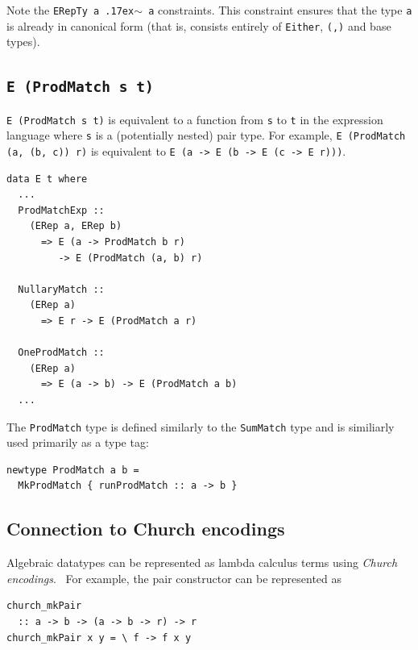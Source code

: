 \documentclass[runningheads, a4paper]{llncs}
\newcommand{\typeeq}{\raise.17ex\hbox{$\scriptstyle\mathtt{\sim}$}\,\;}
\newcommand{\ttt}{\texttt}
\newcommand{\showtodos}{}  %
\newenvironment{todo}
  {\ifthenelse{\isundefined{\showtodos}}{\comment}{\begin{tcolorbox}
    \textbf{TODO}:}}
  {\ifthenelse{\isundefined{\showtodos}}{\endcomment}{\end{tcolorbox}}
  }
\begin{document}
Note the \ttt{ERepTy a \typeeq a} constraints. This constraint ensures that the type
\ttt{a} is already in canonical form (that is, consists entirely of
\ttt{Either}, \ttt{(,)} and base types).

\subsection{\ttt{E (ProdMatch s t)}}

\ttt{E (ProdMatch s t)} is equivalent to a function from \ttt{s} to
\ttt{t} in the expression language where \ttt{s} is a (potentially
nested) pair type. For example, \ttt{E (ProdMatch (a, (b, c)) r)} is
equivalent to \ttt{E (a -> E (b -> E (c -> E r)))}.

\begin{lstlisting}
data E t where
  ...
  ProdMatchExp ::
    (ERep a, ERep b)
      => E (a -> ProdMatch b r)
         -> E (ProdMatch (a, b) r)

  NullaryMatch ::
    (ERep a)
      => E r -> E (ProdMatch a r)

  OneProdMatch ::
    (ERep a)
      => E (a -> b) -> E (ProdMatch a b)
  ...
\end{lstlisting}

The \ttt{ProdMatch} type is defined similarly to the \ttt{SumMatch} type and is
similiarly used primarily as a type tag:

\begin{lstlisting}
newtype ProdMatch a b =
  MkProdMatch { runProdMatch :: a -> b }
\end{lstlisting}

\subsection{Connection to Church encodings}
\label{sec:Church}

Algebraic datatypes can be represented as lambda calculus terms using
\textit{Church encodings}.~\cite{Boehm:1985:AutoSynth} For example, the pair constructor can be
represented as

\begin{lstlisting}
church_mkPair
  :: a -> b -> (a -> b -> r) -> r
church_mkPair x y = \ f -> f x y
\end{lstlisting}
\end{document}
